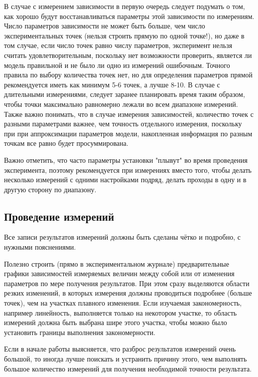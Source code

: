 В случае с измерением зависимости в первую очередь следует подумать о том, как хорошо будут восстанавливаться параметры этой зависимости по измерениям. Число параметров зависимости не может быть больше, чем число экспериментальных точек (нельзя строить прямую по одной точке!), но даже в том случае, если число точек равно числу параметров, эксперимент нельзя считать удовлетворительным, поскольку нет возможности проверить, является ли модель правильной и не было ли одно из измерений ошибочным. Точного правила по выбору количества точек нет, но для определения параметров прямой рекомендуется иметь как минимум 5-6 точек, а лучше 8-10. В случае с длительными измерениями, следует заранее планировать время таким образом, чтобы точки максимально равномерно лежали во всем диапазоне измерений. Также важно понимать, что в случае измерения зависимостей, количество точек с разными параметрами важнее, чем точность отдельного измерения, поскольку при при аппроксимации параметров модели, накопленная информация по разным точкам все равно будет просуммирована.

Важно отметить, что часто параметры установки "плывут" во время проведения эксперимента, поэтому рекомендуется при измерениях вместо того, чтобы делать несколько измерений с одними настройками подряд, делать проходы в одну и в другую сторону по диапазону.

\subsection{Проведение измерений}

Все записи результатов измерений должны быть сделаны чётко и подробно,
с нужными пояснениями.

Полезно строить (прямо в экспериментальном журнале) предварительные графики зависимостей измеряемых величин
между собой или от изменения параметров по мере получения результатов.
При этом сразу выделяются области резких изменений, в которых измерения
должны проводиться подробнее (больше точек), чем на участках плавного
изменения. Если изучаемая закономерность, например линейность, выполняется
только на некотором участке, то область измерений должна быть выбрана
шире этого участка, чтобы можно было установить границы выполнения
закономерности.

Если в начале работы выясняется, что разброс результатов измерений
очень большой, то иногда лучше поискать и устранить причину этого,
чем выполнять большое количество измерений для получения необходимой
точности результата. 

